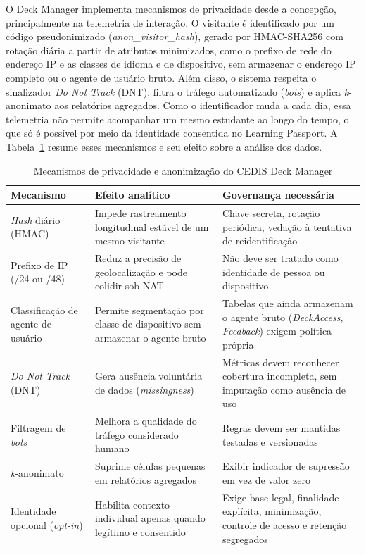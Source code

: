 O Deck Manager implementa mecanismos de privacidade desde a concepção,
principalmente na telemetria de interação. O visitante é identificado por
um código pseudonimizado (\textit{anon\_visitor\_hash}), gerado por
HMAC-SHA256 com rotação diária a partir de atributos minimizados, como o
prefixo de rede do endereço IP e as classes de idioma e de dispositivo, sem
armazenar o endereço IP completo ou o agente de usuário bruto. Além disso, o
sistema respeita o sinalizador \textit{Do Not Track} (DNT), filtra o
tráfego automatizado (\textit{bots}) e aplica \textit{k}-anonimato aos
relatórios agregados. Como o identificador muda a cada dia, essa telemetria
não permite acompanhar um mesmo estudante ao longo do tempo, o que só é
possível por meio da identidade consentida no Learning Passport. A
Tabela~\ref{tab:privacidade-deck-manager} resume esses mecanismos e seu
efeito sobre a análise dos dados.

\begin{table}[htb]
\caption{Mecanismos de privacidade e anonimização do CEDIS Deck Manager}
\label{tab:privacidade-deck-manager}
\centering
\begin{tabularx}{\textwidth}{l>{\raggedright\arraybackslash}X>{\raggedright\arraybackslash}X}
\hline
\textbf{Mecanismo} & \textbf{Efeito analítico} & \textbf{Governança necessária} \\
\hline
\textit{Hash} diário (HMAC) & Impede rastreamento longitudinal estável de um mesmo visitante & Chave secreta, rotação periódica, vedação à tentativa de reidentificação \\
\hline
Prefixo de IP (/24 ou /48) & Reduz a precisão de geolocalização e pode colidir sob NAT & Não deve ser tratado como identidade de pessoa ou dispositivo \\
\hline
Classificação de agente de usuário & Permite segmentação por classe de dispositivo sem armazenar o agente bruto & Tabelas que ainda armazenam o agente bruto (\textit{DeckAccess}, \textit{Feedback}) exigem política própria \\
\hline
\textit{Do Not Track} (DNT) & Gera ausência voluntária de dados (\textit{missingness}) & Métricas devem reconhecer cobertura incompleta, sem imputação como ausência de uso \\
\hline
Filtragem de \textit{bots} & Melhora a qualidade do tráfego considerado humano & Regras devem ser mantidas testadas e versionadas \\
\hline
\textit{k}-anonimato & Suprime células pequenas em relatórios agregados & Exibir indicador de supressão em vez de valor zero \\
\hline
Identidade opcional (\textit{opt-in}) & Habilita contexto individual apenas quando legítimo e consentido & Exige base legal, finalidade explícita, minimização, controle de acesso e retenção segregados \\
\hline
\end{tabularx}
\end{table}

